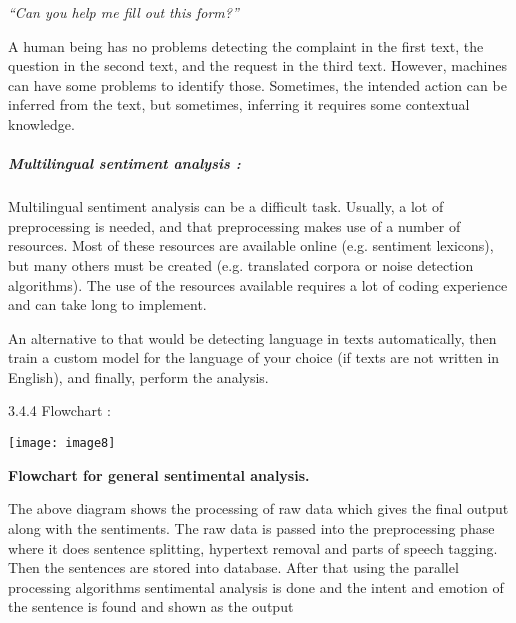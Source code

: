 \documentclass{article} %
\begin{document}
\noindent \textit{``Can you help me fill out this form?''}

A human being has no problems detecting the complaint in the first text, the question in the second text, and the request in the third text. However, machines can have some problems to identify those. Sometimes, the intended action can be inferred from the text, but sometimes, inferring it requires some contextual knowledge.


\subparagraph{ Multilingual sentiment analysis :}

Multilingual sentiment analysis can be a difficult task. Usually, a lot of preprocessing is needed, and that preprocessing makes use of a number of resources. Most of these resources are available online (e.g. sentiment lexicons), but many others must be created (e.g. translated corpora or noise detection algorithms). The use of the resources available requires a lot of coding experience and can take long to implement.

An alternative to that would be detecting language in texts automatically, then train a custom model for the language of your choice (if texts are not written in English), and finally, perform the analysis.





















3.4.4 Flowchart : 

\texttt{[image: image8]}

\textbf{Flowchart for general sentimental analysis.}

\textbf{}

The  above diagram shows the processing of raw data which gives the final output along with the sentiments.  The raw data is passed into the preprocessing phase where it does sentence splitting, hypertext removal and  parts of speech tagging. Then the sentences are stored into database. After that using the parallel processing algorithms sentimental analysis is done and the intent and emotion of the sentence is found and shown as the output
\end{document}
